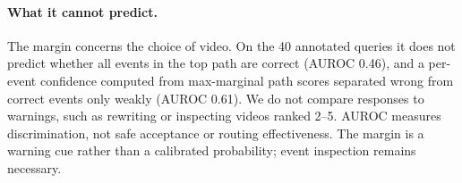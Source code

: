 \paragraph{What it cannot predict.}
The margin concerns the choice of video.
On the 40 annotated queries it does not predict whether all events in the top path are correct (AUROC 0.46), and a per-event confidence computed from max-marginal path scores separated wrong from correct events only weakly (AUROC 0.61).
We do not compare responses to warnings, such as rewriting or inspecting videos ranked 2--5.
AUROC measures discrimination, not safe acceptance or routing effectiveness.
The margin is a warning cue rather than a calibrated probability; event inspection remains necessary.
